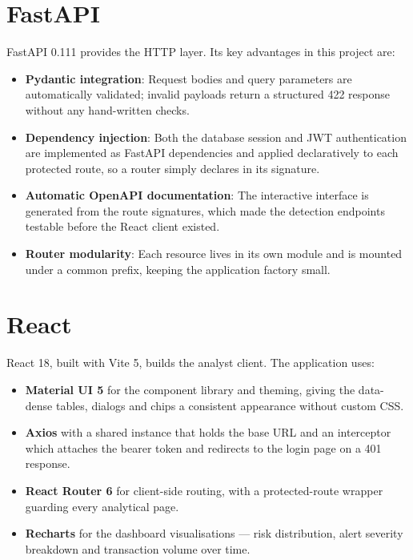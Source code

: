 \section{FastAPI}
FastAPI 0.111 provides the HTTP layer. Its key advantages in this project are:

\begin{itemize}
  \item \textbf{Pydantic integration}: Request bodies and query parameters are automatically validated; invalid payloads return a structured 422 response without any hand-written checks.
  \item \textbf{Dependency injection}: Both the database session and JWT authentication are implemented as FastAPI dependencies and applied declaratively to each protected route, so a router simply declares  in its signature.
  \item \textbf{Automatic OpenAPI documentation}: The interactive  interface is generated from the route signatures, which made the detection endpoints testable before the React client existed.
  \item \textbf{Router modularity}: Each resource lives in its own  module and is mounted under a common  prefix, keeping the application factory small.
\end{itemize}

\section{React}
React 18, built with Vite 5, builds the analyst client. The application uses:

\begin{itemize}
  \item \textbf{Material UI 5} for the component library and theming, giving the data-dense tables, dialogs and chips a consistent appearance without custom CSS.
  \item \textbf{Axios} with a shared instance that holds the base URL and an interceptor which attaches the bearer token and redirects to the login page on a 401 response.
  \item \textbf{React Router 6} for client-side routing, with a protected-route wrapper guarding every analytical page.
  \item \textbf{Recharts} for the dashboard visualisations --- risk distribution, alert severity breakdown and transaction volume over time.
\end{itemize}

